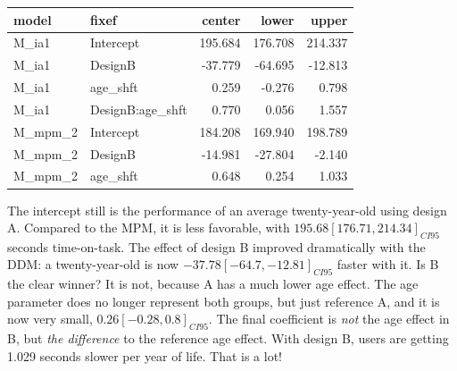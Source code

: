 \documentclass[]{svmono}
\newenvironment{Shaded}{\begin{snugshade}}{\end{snugshade}}
\newcommand{\KeywordTok}[1]{\textcolor[rgb]{0.13,0.29,0.53}{\textbf{#1}}}
\newcommand{\DataTypeTok}[1]{\textcolor[rgb]{0.13,0.29,0.53}{#1}}
\newcommand{\DecValTok}[1]{\textcolor[rgb]{0.00,0.00,0.81}{#1}}
\newcommand{\StringTok}[1]{\textcolor[rgb]{0.31,0.60,0.02}{#1}}
\newcommand{\CommentTok}[1]{\textcolor[rgb]{0.56,0.35,0.01}{\textit{#1}}}
\newcommand{\OperatorTok}[1]{\textcolor[rgb]{0.81,0.36,0.00}{\textbf{#1}}}
\newcommand{\NormalTok}[1]{#1}
\begin{document}
\begin{Shaded}
\end{Shaded}

\begin{Shaded}
\end{Shaded}

\begin{longtable}[]{@{}llrrr@{}}
\toprule
model & fixef & center & lower & upper\tabularnewline
\midrule
\endhead
M\_ia1 & Intercept & 195.684 & 176.708 & 214.337\tabularnewline
M\_ia1 & DesignB & -37.779 & -64.695 & -12.813\tabularnewline
M\_ia1 & age\_shft & 0.259 & -0.276 & 0.798\tabularnewline
M\_ia1 & DesignB:age\_shft & 0.770 & 0.056 & 1.557\tabularnewline
M\_mpm\_2 & Intercept & 184.208 & 169.940 & 198.789\tabularnewline
M\_mpm\_2 & DesignB & -14.981 & -27.804 & -2.140\tabularnewline
M\_mpm\_2 & age\_shft & 0.648 & 0.254 & 1.033\tabularnewline
\bottomrule
\end{longtable}

The intercept still is the performance of an average twenty-year-old
using design A. Compared to the MPM, it is less favorable, with
\(195.68 [176.71, 214.34]_{CI95}\) seconds time-on-task. The effect of
design B improved dramatically with the DDM: a twenty-year-old is now
\(-37.78 [-64.7, -12.81]_{CI95}\) faster with it. Is B the clear winner?
It is not, because A has a much lower age effect. The age parameter does
no longer represent both groups, but just reference A, and it is now
very small, \(0.26 [-0.28, 0.8]_{CI95}\). The final coefficient is
\emph{not} the age effect in B, but \emph{the difference} to the
reference age effect. With design B, users are getting 1.029 seconds
slower per year of life. That is a lot!
\end{document}
